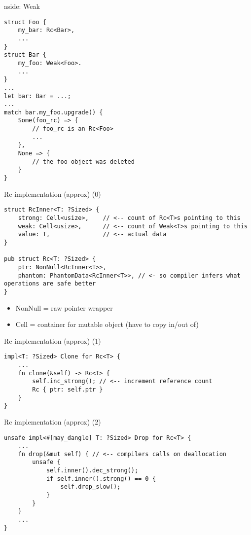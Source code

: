 \begin{frame}[fragile]{aside: Weak}
\begin{verbatim}
struct Foo {
    my_bar: Rc<Bar>,
    ...
}
struct Bar {
    my_foo: Weak<Foo>.
    ...
}
...
let bar: Bar = ...;
...
match bar.my_foo.upgrade() {
    Some(foo_rc) => {
        // foo_rc is an Rc<Foo>
        ...
    },
    None => {
        // the foo object was deleted
    }
}
\end{verbatim}
\end{frame}



\begin{frame}[fragile,label=rcImplA]{Rc implementation (approx) (0)}
\begin{verbatim}
struct RcInner<T: ?Sized> {
    strong: Cell<usize>,    // <-- count of Rc<T>s pointing to this
    weak: Cell<usize>,      // <-- count of Weak<T>s pointing to this
    value: T,               // <-- actual data
}

pub struct Rc<T: ?Sized> {
    ptr: NonNull<RcInner<T>>,
    phantom: PhantomData<RcInner<T>>, // <- so compiler infers what operations are safe better
}
\end{verbatim}
\begin{itemize}
\item NonNull = raw pointer wrapper
\item Cell = container for mutable object (have to copy in/out of)
\end{itemize}
\end{frame}



\begin{frame}[fragile,label=rcImplA]{Rc implementation (approx) (1)}
\begin{verbatim}
impl<T: ?Sized> Clone for Rc<T> {
    ... 
    fn clone(&self) -> Rc<T> {
        self.inc_strong(); // <-- increment reference count
        Rc { ptr: self.ptr }
    }
}
\end{verbatim}
\end{frame}

\begin{frame}[fragile,label=rcImplB]{Rc implementation (approx) (2)}
\begin{verbatim}
unsafe impl<#[may_dangle] T: ?Sized> Drop for Rc<T> {
    ...
    fn drop(&mut self) { // <-- compilers calls on deallocation
        unsafe {
            self.inner().dec_strong();
            if self.inner().strong() == 0 {
                self.drop_slow();
            }
        }
    }
    ...
}
\end{verbatim}
\end{frame}

